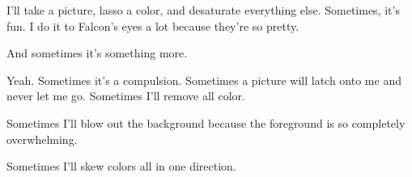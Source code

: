 

\begin{paracol}{2}
  \begin{leftcolumn}
\noindent I'll take a picture, lasso a color, and desaturate everything else. Sometimes, it's fun. I do it to Falcon's eyes a lot because they're so pretty.

\begin{ally}
And sometimes it's something more.
\end{ally}
Yeah. Sometimes it's a compulsion. Sometimes a picture will latch onto me and never let me go. Sometimes I'll remove all color.
\end{leftcolumn}
\end{paracol}


% 



\begin{paracol}{2}
  \begin{leftcolumn}
\noindent Sometimes I'll blow out the background because the foreground is so completely overwhelming.
\end{leftcolumn}
\end{paracol}



\begin{paracol}{2}
  \begin{leftcolumn}
\noindent Sometimes I'll skew colors all in one direction.
\end{leftcolumn}
\end{paracol}



\vfill
\newpage

